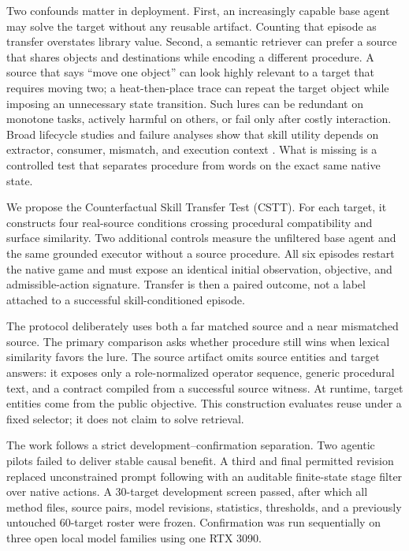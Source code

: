 \documentclass[10pt]{article}
\begin{document}
Two confounds matter in deployment. First, an increasingly capable base agent
may solve the target without any reusable artifact. Counting that episode as
transfer overstates library value. Second, a semantic retriever can prefer a
source that shares objects and destinations while encoding a different
procedure. A source that says ``move one object'' can look highly relevant to a
target that requires moving two; a heat-then-place trace can repeat the target
object while imposing an unnecessary state transition. Such lures can be
redundant on monotone tasks, actively harmful on others, or fail only after
costly interaction. Broad lifecycle studies and failure analyses show that skill
utility depends on extractor, consumer, mismatch, and execution context
\citep{huang2026consumption,dong2026harmful}. What is missing is a controlled
test that separates procedure from words on the exact same native state.

We propose the Counterfactual Skill Transfer Test (CSTT). For each target, it
constructs four real-source conditions crossing procedural compatibility and
surface similarity. Two additional controls measure the unfiltered base agent
and the same grounded executor without a source procedure. All six episodes
restart the native game and must expose an identical initial observation,
objective, and admissible-action signature. Transfer is then a paired outcome,
not a label attached to a successful skill-conditioned episode.

The protocol deliberately uses both a far matched source and a near mismatched
source. The primary comparison asks whether procedure still wins when lexical
similarity favors the lure. The source artifact omits source entities and target
answers: it exposes only a role-normalized operator sequence, generic procedural
text, and a contract compiled from a successful source witness. At runtime,
target entities come from the public objective. This construction evaluates
reuse under a fixed selector; it does not claim to solve retrieval.

The work follows a strict development--confirmation separation. Two agentic
pilots failed to deliver stable causal benefit. A third and final permitted
revision replaced unconstrained prompt following with an auditable finite-state
stage filter over native actions. A 30-target development screen passed, after
which all method files, source pairs, model revisions, statistics, thresholds,
and a previously untouched 60-target roster were frozen. Confirmation was run
sequentially on three open local model families using one RTX 3090.
\end{document}

